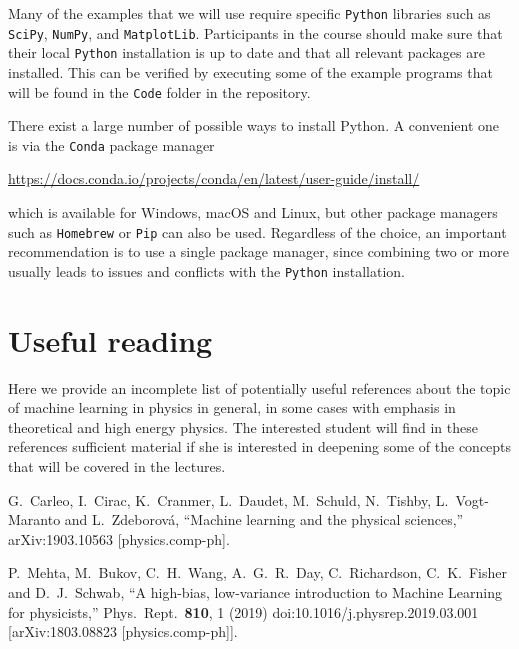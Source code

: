 \documentclass[12pt]{article}
\numberwithin{equation}{section}
\begin{document}
\begin{spacing}{1.1}
Many of the examples that we will use require specific {\tt Python} libraries
such as {\tt SciPy}, {\tt NumPy}, and {\tt  MatplotLib}.
%
Participants in the course should make sure that their local {\tt Python}
installation is up to date and that all relevant packages are installed.
%
This can be verified by executing some of the example programs that
will be found in the {\tt Code} folder in the repository.

There exist a large number of possible ways to install Python.
%
A convenient one is via the {\tt Conda} package manager
\begin{center}
\url{https://docs.conda.io/projects/conda/en/latest/user-guide/install/}
\end{center}
which is available for Windows, macOS and Linux, but other package managers
such as {\tt Homebrew} or {\tt Pip} can also be used.
%
Regardless of the choice, an important recommendation is to use a single
package manager, since combining two or more usually leads to issues
and conflicts
with the {\tt Python} installation.

\section{Useful reading}

Here we provide an incomplete list of potentially useful references about the topic
of machine learning in physics in general, in some cases with emphasis
in theoretical and high energy physics.
%
The interested student will find in these references sufficient material if
she is interested in deepening some of the concepts that will be covered in the lectures.

\begin{thebibliography}{99}

  G.~Carleo, I.~Cirac, K.~Cranmer, L.~Daudet, M.~Schuld, N.~Tishby, L.~Vogt-Maranto and L.~Zdeborová,
  ``Machine learning and the physical sciences,''
  arXiv:1903.10563 [physics.comp-ph].

  P.~Mehta, M.~Bukov, C.~H.~Wang, A.~G.~R.~Day, C.~Richardson, C.~K.~Fisher and D.~J.~Schwab,
  ``A high-bias, low-variance introduction to Machine Learning for physicists,''
  Phys.\ Rept.\  {\bf 810}, 1 (2019)
  doi:10.1016/j.physrep.2019.03.001
  [arXiv:1803.08823 [physics.comp-ph]].


\end{thebibliography}
\end{spacing}
\end{document}

